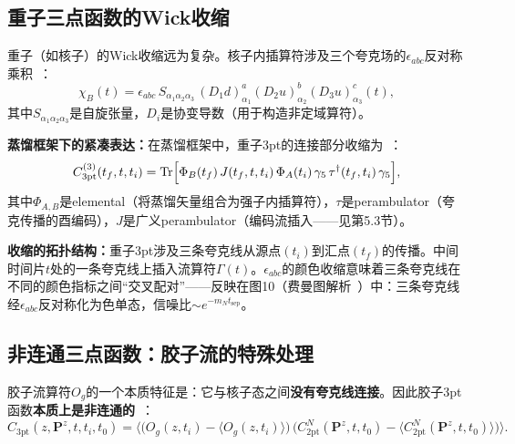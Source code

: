 \documentclass[12pt,a4paper]{ctexart}
\theoremstyle{definition}
\begin{document}
\subsection{重子三点函数的Wick收缩}

重子（如核子）的Wick收缩远为复杂。核子内插算符涉及三个夸克场的$\epsilon_{abc}$反对称乘积~\cite{wickContraction2026,distillation2026}：
\begin{equation}\label{eq:baryon_interp}
    \chi_B(t) = \epsilon_{abc}\, S_{\alpha_1\alpha_2\alpha_3}\,
    (D_1 d)^a_{\alpha_1} (D_2 u)^b_{\alpha_2} (D_3 u)^c_{\alpha_3}(t),
\end{equation}
其中$S_{\alpha_1\alpha_2\alpha_3}$是自旋张量，$D_i$是协变导数（用于构造非定域算符）。

\textbf{蒸馏框架下的紧凑表达：}在蒸馏框架中，重子3pt的连接部分收缩为~\cite{distillation2026,wickContraction2026}：
\begin{equation}\label{eq:baryon_3pt_distillation}
    C_{3\text{pt}}^{(3)}(t_f, t, t_i) = \operatorname{Tr}\Bigl[ \Phi_B(t_f)\,J(t_f, t, t_i)\,\Phi_A(t_i)\,\gamma_5\,\tau^\dagger(t_f, t_i)\,\gamma_5 \Bigr],
\end{equation}
其中$\Phi_{A,B}$是elemental（将蒸馏矢量组合为强子内插算符），$\tau$是perambulator（夸克传播的酉编码），$J$是广义perambulator（编码流插入——见第5.3节）。

\textbf{收缩的拓扑结构：}重子3pt涉及三条夸克线从源点$(t_i)$到汇点$(t_f)$的传播。中间时间片$t$处的一条夸克线上插入流算符$\Gamma(t)$。$\epsilon_{abc}$的颜色收缩意味着三条夸克线在不同的颜色指标之间``交叉配对''——反映在图10（费曼图解析~\cite{feynmanDiagrams2026}）中：三条夸克线经$\epsilon_{abc}$反对称化为色单态，信噪比$\sim e^{-m_N t_{\text{sep}}}$。

\subsection{非连通三点函数：胶子流的特殊处理}

胶子流算符$O_g$的一个本质特征是：它与核子态之间\textbf{没有夸克线连接}。因此胶子3pt函数\textbf{本质上是非连通的}~\cite{correlationFunctions2026,gluonQuasiOpReport2026}：
\begin{equation}\label{eq:gluon_disconnected}
    C_{3\text{pt}}(z, \mathbf{P}^z, t, t_i, t_0) =
    \big\langle \bigl(O_g(z, t_i) - \langle O_g(z, t_i)\rangle\bigr)\,
    \bigl(C_{2\text{pt}}^N(\mathbf{P}^z, t, t_0) - \langle C_{2\text{pt}}^N(\mathbf{P}^z, t, t_0)\rangle\bigr) \big\rangle.
\end{equation}
\end{document}

